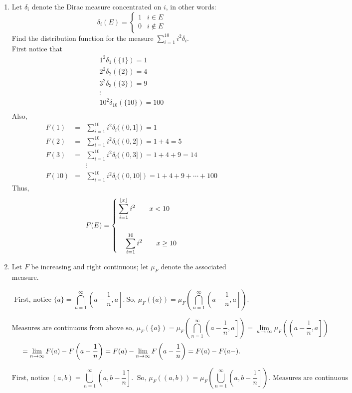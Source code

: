 \begin{enumerate}
\item Let $\delta_i$ denote the Dirac measure concentrated on $i$, in other words: \\
\[
\delta_i(E)= \left\{
\begin{array}{ll} 
      1 & i \in E \\
      0 & i \not\in E 
\end{array} 
 \right. 
\]
Find the distribution function for the measure $\sum_{i=1}^{10} i^2 \delta_i$.\\
First notice that 
\[
\begin{array}{c}
1^2 \delta_1(\{1\})=1 \\
2^2 \delta_2(\{2\})=4 \\
3^2 \delta_3(\{3\})=9 \\
\vdots \\
10^2 \delta_{10}(\{ 10 \}) = 100 \\
\end{array}
\]
Also, 
\begin{eqnarray*}
F(1)&=&\sum_{i=1}^{10} i^2 \delta_i((0,1])=1 \\
F(2)&=&\sum_{i=1}^{10} i^2 \delta_i((0,2])=1+4 =5 \\
F(3)&=&\sum_{i=1}^{10} i^2 \delta_i((0,3])=1+4+9=14  \\
 & & \vdots \\
F(10)&=&\sum_{i=1}^{10} i^2 \delta_i((0,10]) = 1+4+9 + \cdots + 100
\end{eqnarray*}
Thus, 
\[
F(E)= \left\{
\begin{multlined} 
     \sum_{i=1}^{\lfloor x \rfloor}i^2 \qquad x <10 \\
      \vspace{.005cm}\\
 \sum_{i=1}^{10}i^2 \qquad x \geq 10
\end{multlined} \right.
\]
\item Let $F$ be increasing and right continuous; let $\mu_F$ denote the associated measure. 
\\
\begin{center}\end{center}
\[
\text{First, notice } \{a\} = \bigcap_{n=1}^\infty \left(a - \frac{1}{n}, a\right]. \  \text{So, } \mu_F (\{a\}) = \mu_F \left( \bigcap_{n=1}^\infty \left(a - \frac{1}{n}, a\right] \right).
\]


 \[
\text{Measures are continuous from above so, } \mu_F (\{a\}) = \mu_F \left( \bigcap_{n=1}^\infty \left(a - \frac{1}{n}, a\right] \right) = \lim_{n \rightarrow \infty}\mu_F \left( \left(a - \frac{1}{n}, a\right] \right)
\]
\[
= \lim_{n \rightarrow \infty} F(a) - F\left(a - \frac{1}{n}\right) = F(a) - \lim_{n \rightarrow \infty} F\left(a - \frac{1}{n} \right)= F(a)-F(a-) .\vspace{.75cm}
\]
\begin{center} \end{center}
\[
\text{First, notice } (a,b) = \bigcup_{n=1}^\infty \left(a, b- \frac{1}{n}\right]. \  \text{ So, } \mu_F ((a,b)) = \mu_F \left( \bigcup_{n=1}^\infty \left(a, b- \frac{1}{n}\right] \right). \text{ Measures are continuous}
\]



\end{enumerate}
